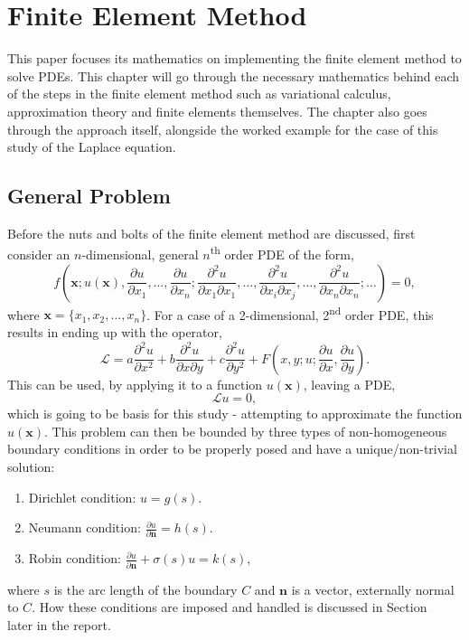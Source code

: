 \clearpage
\chapter{Finite Element Method}

This paper focuses its mathematics on implementing the finite element method to solve PDEs. This chapter will go through the necessary mathematics behind each of the steps in the finite element method such as variational calculus, approximation theory and finite elements themselves. The chapter also goes through the approach itself, alongside the worked example for the case of this study of the Laplace equation.

\section{General Problem}

Before the nuts and bolts of the finite element method are discussed, first consider an $n$-dimensional, general $n$\textsuperscript{th} order PDE of the form,
\begin{equation}
	f\left(\mathbf{x}; u(\mathbf{x}), \frac{\partial u}{\partial x_1},\dots, \frac{\partial u}{\partial x_n}; \frac{\partial^2 u}{\partial x_1 \partial x_1},\dots,\frac{\partial^2 u}{\partial x_i \partial x_j},\dots, \frac{\partial^2 u}{\partial x_n \partial x_n}; \dots\right) = 0,
\end{equation}
where $\mathbf{x} = \{x_1,x_2,\dots,x_n\}$.
For a case of a 2-dimensional, 2\textsuperscript{nd} order PDE, this results in ending up with the operator,
\begin{equation}
	\mathcal{L} = a \frac{\partial^2 u}{\partial x^2} + b \frac{\partial^2 u}{\partial x \partial y} + c \frac{\partial^2 u}{\partial y^2} + F\left(x,y; u; \frac{\partial u}{\partial x}, \frac{\partial u}{\partial y}\right).
\end{equation}
This can be used, by applying it to a function $u(\mathbf{x})$, leaving a PDE,
\begin{equation}\label{pde}
	\mathcal{L}u = 0,
\end{equation}
which is going to be basis for this study - attempting to approximate the function $u(\mathbf{x})$. This problem can then be bounded by three types of non-homogeneous boundary conditions in order to be properly posed and have a unique/non-trivial solution:
\begin{enumerate}
	\item Dirichlet condition: $u=g(s)$.
	\item Neumann condition: $\frac{\partial u}{\partial \mathbf{n}} = h(s)$.
	\item Robin condition: $\frac{\partial u}{\partial \mathbf{n}} + \sigma(s)u = k(s)$,
\end{enumerate}
where $s$ is the arc length of the boundary $C$ and $\mathbf{n}$ is a vector, externally normal to $C$. How these conditions are imposed and handled is discussed in Section~\, later in the report.

